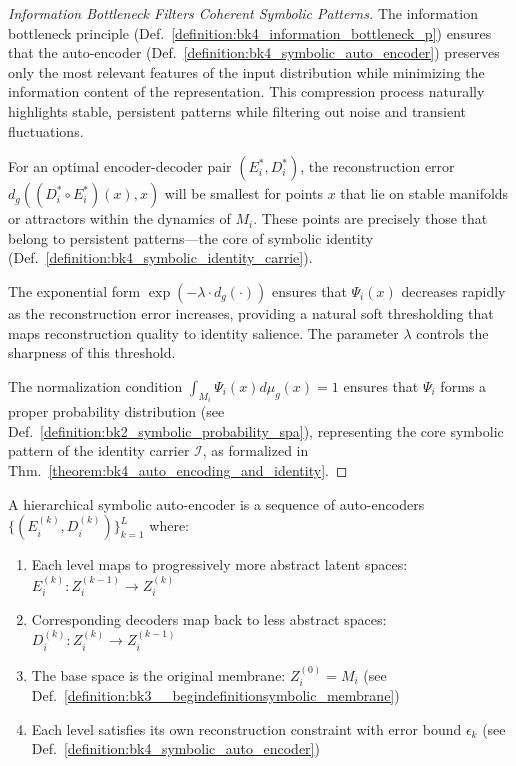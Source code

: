 \begin{proof}[Information Bottleneck Filters Coherent Symbolic Patterns]
\label{proof:bk4_information_bottleneck_symbolic_filter}
The information bottleneck principle (Def.~\ref{definition:bk4_information_bottleneck_p}) ensures that the auto-encoder (Def.~\ref{definition:bk4_symbolic_auto_encoder}) preserves only the most relevant features of the input distribution while minimizing the information content of the representation. This compression process naturally highlights stable, persistent patterns while filtering out noise and transient fluctuations.

For an optimal encoder-decoder pair $(E_i^*, D_i^*)$, the reconstruction error $d_g((D_i^* \circ E_i^*)(x), x)$ will be smallest for points $x$ that lie on stable manifolds or attractors within the dynamics of $M_i$. These points are precisely those that belong to persistent patterns—the core of symbolic identity (Def.~\ref{definition:bk4_symbolic_identity_carrie}).

The exponential form $\exp(-\lambda \cdot d_g(\cdot))$ ensures that $\Psi_i(x)$ decreases rapidly as the reconstruction error increases, providing a natural soft thresholding that maps reconstruction quality to identity salience. The parameter $\lambda$ controls the sharpness of this threshold.

The normalization condition $\int_{M_i} \Psi_i(x) d\mu_g(x) = 1$ ensures that $\Psi_i$ forms a proper probability distribution (see Def.~\ref{definition:bk2_symbolic_probability_spa}), representing the core symbolic pattern of the identity carrier $\mathcal{I}$, as formalized in Thm.~\ref{theorem:bk4_auto_encoding_and_identity}.
\end{proof}
\begin{definition} \label{definition:bk4_hierarchical_auto_encodi}
A hierarchical symbolic auto-encoder is a sequence of auto-encoders $\{(E_i^{(k)}, D_i^{(k)})\}_{k=1}^{L}$ where:
\begin{enumerate}
    \item Each level maps to progressively more abstract latent spaces: $E_i^{(k)}: Z_i^{(k-1)} \to Z_i^{(k)}$
    \item Corresponding decoders map back to less abstract spaces: $D_i^{(k)}: Z_i^{(k)} \to Z_i^{(k-1)}$
    \item The base space is the original membrane: $Z_i^{(0)} = M_i$ (see Def.~\ref{definition:bk3__begindefinitionsymbolic_membrane})
    \item Each level satisfies its own reconstruction constraint with error bound $\epsilon_k$ (see Def.~\ref{definition:bk4_symbolic_auto_encoder})
\end{enumerate}
\end{definition}
